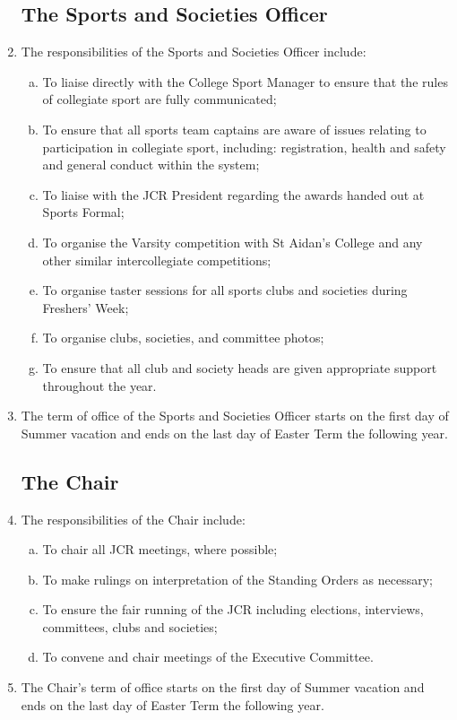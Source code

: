 \documentclass[12pt]{article}
\begin{document}
\begin{enumerate}
    \subsection{The Sports and Societies Officer}
    \item The responsibilities of the Sports and Societies Officer include:
    \begin{enumerate}[(a)]
        \item To liaise directly with the College Sport Manager to ensure that the rules of collegiate sport are fully communicated;
        \item To ensure that all sports team captains are aware of issues relating to participation in collegiate sport, including: registration, health and safety and general conduct within the system;
        \item To liaise with the JCR President regarding the awards handed out at Sports Formal;
        \item To organise the Varsity competition with St Aidan’s College and any other similar intercollegiate competitions;
        \item To organise taster sessions for all sports clubs and societies during Freshers’ Week;
        \item To organise clubs, societies, and committee photos;
        \item To ensure that all club and society heads are given appropriate support throughout the year.
    \end{enumerate}
    \item The term of office of the Sports and Societies Officer starts on the first day of Summer vacation and ends on the last day of Easter Term the following year.
    \subsection{The Chair}
    \item The responsibilities of the Chair include:
    \begin{enumerate}[(a)]
        \item To chair all JCR meetings, where possible;
        \item To make rulings on interpretation of the Standing Orders as necessary;
        \item To ensure the fair running of the JCR including elections, interviews, committees, clubs and societies;
        \item To convene and chair meetings of the Executive Committee.
    \end{enumerate}
    \item The Chair's term of office starts on the first day of Summer vacation and ends on the last day of Easter Term the following year.
\end{enumerate}
\newpage
\end{document}
